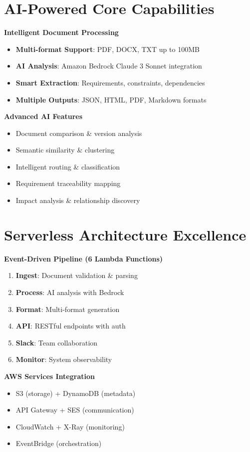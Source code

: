 \documentclass[11pt,letterpaper]{article}
\begin{document}
\begin{multicols}{2}

\section*{AI-Powered Core Capabilities}

\textbf{Intelligent Document Processing}
\begin{itemize}[itemsep=1pt]
\item \textbf{Multi-format Support}: PDF, DOCX, TXT up to 100MB
\item \textbf{AI Analysis}: Amazon Bedrock Claude 3 Sonnet integration
\item \textbf{Smart Extraction}: Requirements, constraints, dependencies
\item \textbf{Multiple Outputs}: JSON, HTML, PDF, Markdown formats
\end{itemize}

\textbf{Advanced AI Features}
\begin{itemize}[itemsep=1pt]
\item Document comparison \& version analysis
\item Semantic similarity \& clustering
\item Intelligent routing \& classification
\item Requirement traceability mapping
\item Impact analysis \& relationship discovery
\end{itemize}

\section*{Serverless Architecture Excellence}

\textbf{Event-Driven Pipeline (6 Lambda Functions)}
\begin{enumerate}[itemsep=1pt]
\item \textbf{Ingest}: Document validation \& parsing
\item \textbf{Process}: AI analysis with Bedrock
\item \textbf{Format}: Multi-format generation
\item \textbf{API}: RESTful endpoints with auth
\item \textbf{Slack}: Team collaboration
\item \textbf{Monitor}: System observability
\end{enumerate}

\textbf{AWS Services Integration}
\begin{itemize}[itemsep=1pt]
\item S3 (storage) + DynamoDB (metadata)
\item API Gateway + SES (communication)
\item CloudWatch + X-Ray (monitoring)
\item EventBridge (orchestration)
\end{itemize}


\end{multicols}
\end{document}
